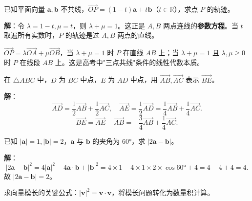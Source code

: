\documentclass[12pt, a4paper]{ctexart}
\begin{document}
\vspace{6pt}

\begin{examplebox}
已知平面向量 $\boldsymbol{a},\boldsymbol{b}$ 不共线，$\overrightarrow{OP}=(1-t)\boldsymbol{a}+t\boldsymbol{b}$（$t\in\mathbb{R}$），求点 $P$ 的轨迹。
\end{examplebox}

\noindent\textbf{解}：令 $\lambda=1-t,\mu=t$，则 $\lambda+\mu=1$。这正是 $A,B$ 两点连线的\textbf{参数方程}。当 $t$ 取遍所有实数时，$P$ 的轨迹是过 $A,B$ 两点的直线。

\begin{tipbox}[规律总结]
$\overrightarrow{OP}=\lambda\overrightarrow{OA}+\mu\overrightarrow{OB}$，当 $\lambda+\mu=1$ 时 $P$ 在直线 $AB$ 上；当 $\lambda+\mu=1$ 且 $\lambda,\mu\geq0$ 时 $P$ 在线段 $AB$ 上。这是高考中"三点共线"条件的线性代数本质。
\end{tipbox}

\vspace{6pt}

\begin{examplebox}[【例题7】用基底证明几何关系]
在 $\triangle ABC$ 中，$D$ 为 $BC$ 中点，$E$ 为 $AD$ 中点，用 $\overrightarrow{AB},\overrightarrow{AC}$ 表示 $\overrightarrow{BE}$。
\end{examplebox}

\noindent\textbf{解}：
\[
  \overrightarrow{AD}=\frac{1}{2}\overrightarrow{AB}+\frac{1}{2}\overrightarrow{AC},\quad
  \overrightarrow{AE}=\frac{1}{2}\overrightarrow{AD}=\frac{1}{4}\overrightarrow{AB}+\frac{1}{4}\overrightarrow{AC}.
\]
\[
  \overrightarrow{BE}=\overrightarrow{AE}-\overrightarrow{AB}=-\frac{3}{4}\overrightarrow{AB}+\frac{1}{4}\overrightarrow{AC}.
\]

\vspace{6pt}

\begin{examplebox}[【例题8】向量与不等式综合]
已知 $|\boldsymbol{a}|=1,|\boldsymbol{b}|=2$，$\boldsymbol{a}$ 与 $\boldsymbol{b}$ 的夹角为 $60°$，求 $|2\boldsymbol{a}-\boldsymbol{b}|$。
\end{examplebox}

\noindent\textbf{解}：
\[
  |2\boldsymbol{a}-\boldsymbol{b}|^2=4|\boldsymbol{a}|^2-4\boldsymbol{a}\cdot\boldsymbol{b}+|\boldsymbol{b}|^2
  =4\times1-4\times1\times2\times\cos60°+4=4-4+4=4.
\]
故 $|2\boldsymbol{a}-\boldsymbol{b}|=2$。

\begin{tipbox}[方法总结]
求向量模长的关键公式：$|\boldsymbol{v}|^2=\boldsymbol{v}\cdot\boldsymbol{v}$，将模长问题转化为数量积计算。
\end{tipbox}
\end{document}
